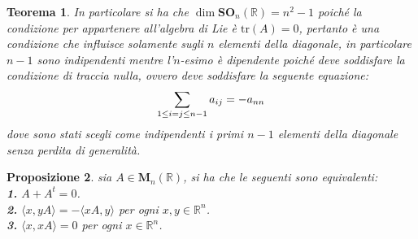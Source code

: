 \documentclass[oneside, 11pt]{amsbook}
\makeatletter
\newcommand{\0}{{(0)}}
\newcommand{\3}{{(3)}}
\theoremstyle{colonplain}
\newtheorem{thm}{Teorema}[chapter]
\newtheorem{prop}[thm]{Proposizione}
\theoremstyle{colondefinition}
\theoremstyle{colonremark}
\numberwithin{equation}{chapter}
\renewcommand{\proofname}{Dimostrazione}
\renewenvironment{proof}[1][\proofname]{\par
  \pushQED{\qed}%
  \normalfont \topsep6\p@\@plus6\p@\relax
  \trivlist
  \item[\hskip\labelsep\bfseries #1:]\ignorespaces
}{%
  \popQED\endtrivlist\@endpefalse
}
\makeatother
\begin{document}
\begin{thm}
\begin{proof}
In particolare si ha che $\dim \mathbf{SO}_n(\mathbb{R}) = n^2 - 1$ poiché la condizione per appartenere all'algebra di Lie è $\mathrm{tr}(A) = 0$, pertanto è una condizione che influisce solamente sugli $n$ elementi della diagonale, in particolare $n - 1$ sono indipendenti mentre l'$n$-esimo è dipendente poiché deve soddisfare la condizione di traccia nulla, ovvero deve soddisfare la seguente equazione:
\begin{align}
    \sum_{1 \leq i = j \leq n - 1} a_{ij} = - a_{nn} \notag
\end{align}
dove sono stati scegli come indipendenti i primi $n - 1$ elementi della diagonale senza perdita di generalità. \end{proof}
\end{thm}
\begin{prop} sia $A \in \mathbf{M}_n(\mathbb{R})$, si ha che le seguenti sono equivalenti: \\
\textbf{1.} $A + A^t = 0$. \\
\textbf{2.} $\langle x, yA \rangle = -\langle xA, y \rangle$ per ogni $x, y \in \mathbb{R}^n$. \\
\textbf{3.} $\langle x, xA \rangle = 0$ per ogni $x \in \mathbb{R}^n$. \\


\end{prop}
\end{document}
